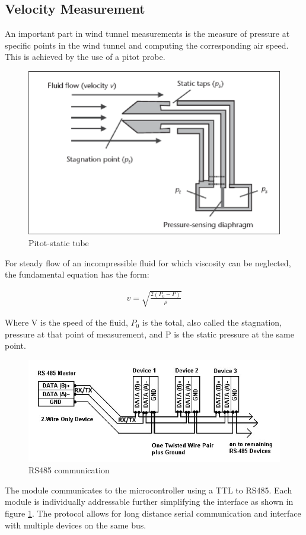 \subsection{Velocity Measurement}
An important part in wind tunnel measurements is the measure of pressure at specific points in the wind tunnel and computing the corresponding air speed. This is achieved by the use of a pitot probe. 
\begin{center}
\begin{figure}[H]
\centering
\includegraphics[width=0.6\linewidth]{Figures/pitot}
\caption[Pitot-static tube]{Pitot-static tube \cite{viquerat_continuous_2006}}
\end{figure}
\end{center}
For steady flow of an incompressible fluid for which viscosity can be neglected, the fundamental equation has the form\cite{viquerat_continuous_2006}:

\begin{ceqn}
	\begin{align}
	v = \sqrt{\frac{2(P_{0} - P)}{\rho}}
\end{align}
\end{ceqn}

Where V is the speed of the fluid, $P_{0}$ is the total, also called the stagnation, pressure at that point of measurement, and P is the static pressure at the same point.
                                                                                                                                                           
\begin{center}
\begin{figure}[H]
\centering
\includegraphics{Figures/modbus}
\caption[RS485 communication]{RS485 communication}
\label{fig:rs485}
\end{figure}
\end{center}
The module communicates to the microcontroller using a TTL to RS485. Each module is individually addressable further simplifying the interface as shown in figure \ref{fig:rs485}. 
The protocol allows for long distance serial communication and interface with multiple devices on the same bus.

